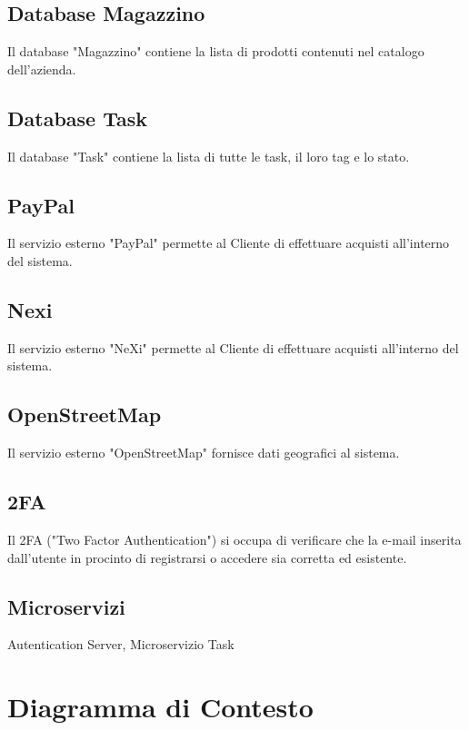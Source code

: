 \documentclass{report}
\begin{document}
\subsection{Database Magazzino}
Il database "Magazzino" contiene la lista di prodotti contenuti nel catalogo dell'azienda.

\subsection{Database Task}
Il database "Task" contiene la lista di tutte le task, il loro tag e lo stato.

\subsection{PayPal}
Il servizio esterno "PayPal" permette al Cliente di effettuare acquisti all'interno del sistema.

\subsection{Nexi}
Il servizio esterno "NeXi" permette al Cliente di effettuare acquisti all'interno del sistema.

\subsection{OpenStreetMap}
Il servizio esterno "OpenStreetMap" fornisce dati geografici al sistema.%

\subsection{2FA}
Il 2FA ("Two Factor Authentication") si occupa di verificare che la e-mail inserita dall'utente in procinto di registrarsi o accedere sia corretta ed esistente.

\subsection{Microservizi}
Autentication Server, Microservizio Task


\section{Diagramma di Contesto}
\end{document}
